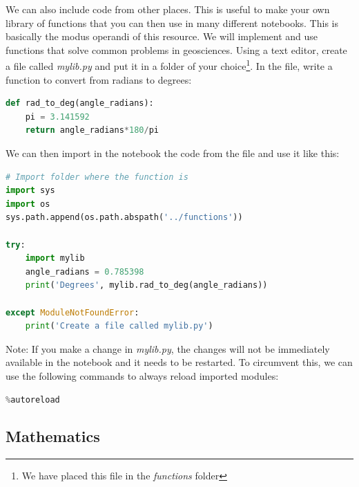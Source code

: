 \documentclass[a4paper , 12pt]{book}
\begin{document}
We can also include code from other places. This is useful to make your own library of functions that you can then use in many different notebooks. This is basically the modus operandi of this resource. We will implement and use functions that solve common problems in geosciences. Using a text editor, create a file called \textit{mylib.py} and put it in a folder of your choice\footnote{We have placed this file in the \textit{functions} folder}. In the file, write a function to convert from radians to degrees:

\begin{center}
\begin{lstlisting}[language=Python, frame=single]
def rad_to_deg(angle_radians):
    pi = 3.141592
    return angle_radians*180/pi
\end{lstlisting}
\end{center}

We can then import in the notebook the code from the file and use it like this:

\begin{center}
\begin{lstlisting}[language=Python, frame=single]
# Import folder where the function is
import sys
import os
sys.path.append(os.path.abspath('../functions'))

try:
    import mylib
    angle_radians = 0.785398
    print('Degrees', mylib.rad_to_deg(angle_radians))
    
except ModuleNotFoundError:
    print('Create a file called mylib.py')
\end{lstlisting}
\end{center}

Note: If you make a change in \textit{mylib.py}, the changes will not be immediately available in the notebook and it needs to be restarted. To circumvent this, we can use the following commands to always reload imported modules:

\begin{center}
\begin{lstlisting}[language=Python, frame=single]
%load_ext autoreload
%autoreload
\end{lstlisting}   
\end{center}

\subsection{Mathematics}
\end{document}
